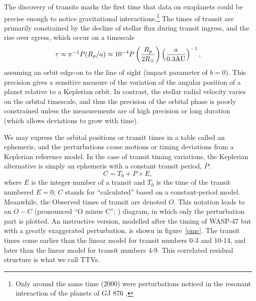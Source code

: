 \documentclass[graybox,natbib,nosecnum]{svmult}
\begin{document}
The discovery of transits marks the first time that data on exoplanets could be precise enough to notice gravitational interactions.\footnote{Only around the same time (2000) were perturbations noticed in the resonant interaction of the planets of GJ 876 \citep{2001Laughlin}.}  The times of transit are primarily constrained by the decline of stellar flux during transit ingress, and the rise over egress, which occur on a timescale 
\begin{equation} \label{ingress}
\tau \approx \pi^{-1} P(R_p/a) \approx 10^{-4}P \left(\frac{R_p}{2 R_\oplus}\right) \left(\frac{a}{0.3 \rm{AU}}\right)^{-1},
\end{equation}  
assuming an orbit edge-on to the line of sight (impact parameter of $b=0$).
This precision gives a sensitive measure of the variation of the angular position of a planet relative to a Keplerian orbit.  In contrast, the stellar radial velocity varies on the orbital timescale, and thus the precision of the orbital phase is poorly constrained unless the measurements are of high precision or long duration (which allows deviations to grow with time).

We may express the orbital positions or transit times in a table called an ephemeris, and the perturbations cause motions or timing deviations from a Keplerian reference model.  In the case of transit timing variations, the Keplerian alternative is simply an ephemeris with a constant transit period, $P$:
\begin{equation}
C = T_0 + P \times E, 
\end{equation}
where $E$ is the integer number of a transit and $T_0$ is the time of the transit numbered $E=0$; $C$ stands for ``calculated'' based on a constant-period model.  Meanwhile, the Observed times of transit are denoted $O$.  This notation leads to an $O-C$ (pronounced ``O minus C''; \citealt{2005Sterken}) diagram, in which only the perturbation part is plotted.  An instructive version, modelled after the timing of WASP-47 \citep{2015Becker} but with a greatly exaggerated perturbation, is shown in figure~\ref{omc}.  The transit times come earlier than the linear model for transit numbers 0-3 and 10-14, and later than the linear model for transit numbers 4-9.  This correlated residual structure is what we call TTVs.
\end{document}

